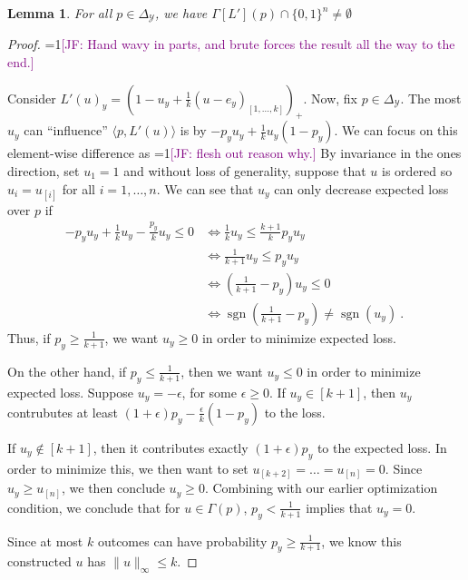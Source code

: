 \documentclass[12pt]{article}
\newcommand{\Comments}{1}
\newcommand{\mynote}[2]{\ifnum\Comments=1\textcolor{#1}{#2}\fi}
\newcommand{\jessie}[1]{\mynote{purple}{[JF: #1]}}
\newcommand{\prop}[1]{\Gamma[#1]}
\newcommand{\simplex}{\Delta_\Y}
\newcommand{\Y}{\mathcal{Y}}
\newcommand{\inprod}[2]{\langle #1, #2 \rangle}%
\DeclareMathOperator*{\sgn}{sgn}
\newtheorem{lemma}{Lemma}
\begin{document}
\begin{lemma}
For all $p \in \simplex$, we have $\prop{L'}(p) \cap \{0,1\}^n \neq \emptyset$ 
\end{lemma}
\begin{proof}
\jessie{Hand wavy in parts, and brute forces the result all the way to the end.}

Consider $L'(u)_y = \left( 1 - u_y + \frac 1 k (u- e_y)_{[1, \ldots, k]} \right)_+$.
Now, fix $p \in \simplex$.
The most $u_y$ can ``influence'' $\inprod{p}{L'(u)}$ is by $-p_y u_y + \frac 1 k u_y (1-p_y)$.
We can focus on this element-wise difference as \jessie{flesh out reason why.}
By invariance in the ones direction, set $u_1 = 1$ and without loss of generality, suppose that $u$ is ordered so $u_i = u_{[i]}$ for all $i= 1, \ldots, n.$ 
We can see that $u_y$ can only decrease expected loss over $p$ if
\begin{align*}
-p_y u_y + \frac 1 k u_y - \frac{p_y}k u_y \leq 0 
&\iff \frac 1 k u_y \leq \frac{k+1}k p_y u_y \\
&\iff \frac 1 {k+1} u_y \leq p_y u_y \\
&\iff (\frac{1}{k+1} - p_y)u_y \leq 0\\
&\iff \sgn(\frac{1}{k+1} - p_y) \neq \sgn(u_y)~.~
\end{align*}
Thus, if $p_y \geq \frac 1 {k+1}$, we want $u_y \geq 0$ in order to minimize expected loss.

On the other hand, if $p_y \leq \frac 1 {k+1}$, then we want $u_y \leq 0$ in order to minimize expected loss.
Suppose $u_y = - \epsilon$, for some $\epsilon \geq 0$.
If $u_y \in [k+1]$, then $u_y$ contrubutes at least $(1 + \epsilon) p_y - \frac{\epsilon}{k}(1-p_y)$ to the loss.

If $u_y \not \in [k+1]$, then it contributes exactly $(1 + \epsilon) p_y$ to the expected loss.
In order to minimize this, we then want to set $u_{[k+2]} = \ldots = u_{[n]} = 0$.
Since $u_y \geq u_{[n]}$, we then conclude $u_y \geq 0$.
Combining with our earlier optimization condition, we conclude that for $u \in \Gamma(p)$, $p_y < \frac 1 {k+1}$ implies that $u_y = 0$.

Since at most $k$ outcomes can have probability $p_y \geq \frac 1 {k+1}$, we know this constructed $u$ has $\|u\|_\infty \leq k$.
\end{proof}
\end{document}
